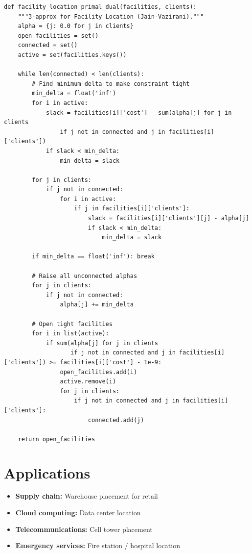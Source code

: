 \documentclass[11pt,oneside]{book}
\begin{document}
\begin{lstlisting}[style=python, caption=Facility Location Primal-Dual]
def facility_location_primal_dual(facilities, clients):
    """3-approx for Facility Location (Jain-Vazirani)."""
    alpha = {j: 0.0 for j in clients}
    open_facilities = set()
    connected = set()
    active = set(facilities.keys())
    
    while len(connected) < len(clients):
        # Find minimum delta to make constraint tight
        min_delta = float('inf')
        for i in active:
            slack = facilities[i]['cost'] - sum(alpha[j] for j in clients 
                if j not in connected and j in facilities[i]['clients'])
            if slack < min_delta:
                min_delta = slack
        
        for j in clients:
            if j not in connected:
                for i in active:
                    if j in facilities[i]['clients']:
                        slack = facilities[i]['clients'][j] - alpha[j]
                        if slack < min_delta:
                            min_delta = slack
        
        if min_delta == float('inf'): break
        
        # Raise all unconnected alphas
        for j in clients:
            if j not in connected:
                alpha[j] += min_delta
        
        # Open tight facilities
        for i in list(active):
            if sum(alpha[j] for j in clients 
                   if j not in connected and j in facilities[i]['clients']) >= facilities[i]['cost'] - 1e-9:
                open_facilities.add(i)
                active.remove(i)
                for j in clients:
                    if j not in connected and j in facilities[i]['clients']:
                        connected.add(j)
    
    return open_facilities
\end{lstlisting}

\section{Applications}
\begin{itemize}
    \item \textbf{Supply chain:} Warehouse placement for retail
    \item \textbf{Cloud computing:} Data center location
    \item \textbf{Telecommunications:} Cell tower placement
    \item \textbf{Emergency services:} Fire station / hospital location
\end{itemize}
\end{document}
